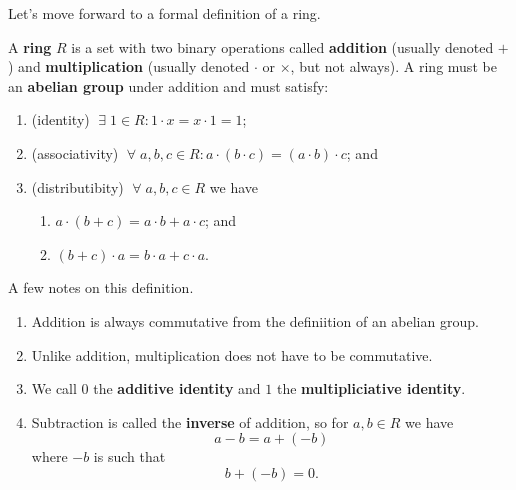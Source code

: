 
Let's move forward to a formal definition of a ring.

\begin{definition}[Ring]
    A \textbf{ring} $R$ is a set with two binary operations called \textbf{addition} (usually denoted $+$) and \textbf{multiplication} (usually denoted $\cdot$ or $\times$, but not always). A ring must be an \textbf{abelian group} under addition and must satisfy:
    \begin{enumerate}
        \item (identity) $\; \exists \; 1 \in R : 1 \cdot x = x \cdot 1 = 1$;
        \item (associativity) $\; \forall \; a, b, c \in R : a \cdot (b \cdot c) = (a \cdot b) \cdot c$; and
        \item (distributibity) $\; \forall \; a, b, c \in R$ we have
            \begin{enumerate}
                \item $a \cdot (b + c) = a \cdot b + a \cdot c$; and
                \item $(b + c) \cdot a = b \cdot a + c \cdot a$.
            \end{enumerate}
    \end{enumerate}
\end{definition}

\begin{remark}
    A few notes on this definition.
    \begin{enumerate}
        \item Addition is always commutative from the definiition of an abelian group.
        \item Unlike addition, multiplication does not have to be commutative.
        \item We call $0$ the \textbf{additive identity} and $1$ the \textbf{multipliciative identity}.
        \item Subtraction is called the \textbf{inverse} of addition, so for $a, b \in R$ we have \[ a - b = a + (-b) \] where $-b$ is such that \[ b + (-b) = 0. \]
    \end{enumerate}
\end{remark}

